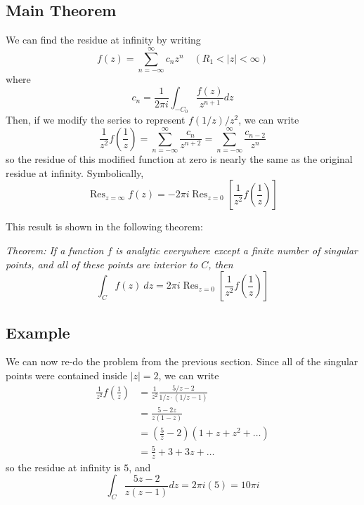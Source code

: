 \documentclass{article}
\DeclareMathOperator{\Res}{Res}
\begin{document}
\subsection{Main Theorem}
We can find the residue at infinity by writing
\[
	f(z) = \sum_{n = -\infty}^\infty c_n z^n	\quad	(R_1 < |z| < \infty)
\]
where
\[
	c_n = \frac{1}{2\pi i} \int_{-C_0} \frac{f(z)}{z^{n+1}} dz
\]
Then, if we modify the series to represent $f(1/z) / z^2$, we can write
\[
	\frac{1}{z^2} f\left(\frac{1}{z} \right)
	= \sum_{n=-\infty}^\infty \frac{c_n}{z^{n+2}}
	= \sum_{n=-\infty}^\infty \frac{c_{n-2}}{z^n}
\]
so the residue of this modified function at zero is nearly the same as the original residue at infinity. Symbolically,
\[
	\Res_{z = \infty} f(z) = -2\pi i \Res_{z = 0} \left[ \frac{1}{z^2} f\left(\frac{1}{z} \right) \right]
\]

This result is shown in the following theorem:

\textit{Theorem: If a function $f$ is analytic everywhere except a finite number of singular points, and all of these points are interior to $C$, then
\[
	\int_C f(z)~dz = 2\pi i \Res_{z = 0} \left[ \frac{1}{z^2} f\left( \frac{1}{z} \right)\right]
\]}

\subsection{Example}
We can now re-do the problem from the previous section. Since all of the singular points were contained inside $|z| = 2$, we can write
\begin{align*}
	\frac{1}{z^2} f\left( \frac{1}{z} \right)
	&= \frac{1}{z^2} \frac{5/z - 2}{1/z \cdot (1/z - 1)} \\
	&= \frac{5 - 2z}{z(1 - z)} \\
	&= \left( \frac{5}{z} - 2 \right) (1 + z + z^2 + \dots) \\
	&= \frac{5}{z} + 3 + 3z + \dots
\end{align*}
so the residue at infinity is $5$, and
\[
	\int_C \frac{5z - 2}{z(z - 1)} dz = 2\pi i(5) = 10\pi i
\]
\end{document}

